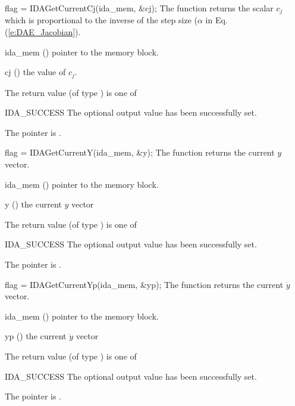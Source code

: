 {
  flag = IDAGetCurrentCj(ida\_mem, \&cj);
}
{
  The function  returns the scalar $c_j$
  which is proportional to the inverse of the step size ($\alpha$ in
  Eq. (\ref{e:DAE_Jacobian}).
}
{
  \begin{args}
  \item[ida\_mem] ()
    pointer to the {\ida} memory block.
  \item[cj] ()
    the value of $c_j$.
  \end{args}
}
{
  The return value  (of type ) is one of
  \begin{args}
  \item[IDA\_SUCCESS]
    The optional output value has been successfully set.
  \item[\Id{IDA\_MEM\_NULL}]
    The  pointer is .
  \end{args}
}
{}

{
  flag = IDAGetCurrentY(ida\_mem, \&y);
}
{
  The function  returns the current $y$ vector.
}
{
  \begin{args}
  \item[ida\_mem] ()
    pointer to the {\ida} memory block.
  \item[y] ()
    the current $y$ vector
  \end{args}
}
{
  The return value  (of type ) is one of
  \begin{args}
  \item[IDA\_SUCCESS]
    The optional output value has been successfully set.
  \item[\Id{IDA\_MEM\_NULL}]
    The  pointer is .
  \end{args}
}
{}

{
  flag = IDAGetCurrentYp(ida\_mem, \&yp);
}
{
  The function  returns the current $\dot{y}$ vector.
}
{
  \begin{args}
  \item[ida\_mem] ()
    pointer to the {\ida} memory block.
  \item[yp] ()
    the current $\dot{y}$ vector
  \end{args}
}
{
  The return value  (of type ) is one of
  \begin{args}
  \item[IDA\_SUCCESS]
    The optional output value has been successfully set.
  \item[\Id{IDA\_MEM\_NULL}]
    The  pointer is .
  \end{args}
}
{}


